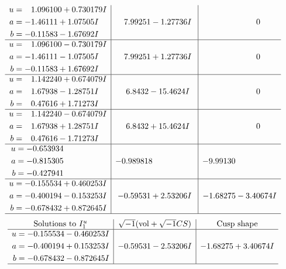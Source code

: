 \documentclass[1p]{elsarticle_modified}
\theoremstyle{definition}
\newcommand{\I}{\sqrt{-1}}
\begin{document}
$$\begin{array}{c|c|c}
\begin{aligned}
u &= \phantom{-}1.096100 + 0.730179 I \\
a &= -1.46111 + 1.07505 I \\
b &= -0.11583 - 1.67692 I\end{aligned}
 & \phantom{-}7.99251 - 1.27736 I & \phantom{-0.000000 } 0 \\ \hline\begin{aligned}
u &= \phantom{-}1.096100 - 0.730179 I \\
a &= -1.46111 - 1.07505 I \\
b &= -0.11583 + 1.67692 I\end{aligned}
 & \phantom{-}7.99251 + 1.27736 I & \phantom{-0.000000 } 0 \\ \hline\begin{aligned}
u &= \phantom{-}1.142240 + 0.674079 I \\
a &= \phantom{-}1.67938 - 1.28751 I \\
b &= \phantom{-}0.47616 + 1.71273 I\end{aligned}
 & \phantom{-}6.8432 - 15.4624 I & \phantom{-0.000000 } 0 \\ \hline\begin{aligned}
u &= \phantom{-}1.142240 - 0.674079 I \\
a &= \phantom{-}1.67938 + 1.28751 I \\
b &= \phantom{-}0.47616 - 1.71273 I\end{aligned}
 & \phantom{-}6.8432 + 15.4624 I & \phantom{-0.000000 } 0 \\ \hline\begin{aligned}
u &= -0.653934\phantom{ +0.000000I} \\
a &= -0.815305\phantom{ +0.000000I} \\
b &= -0.427941\phantom{ +0.000000I}\end{aligned}
 & -0.989818\phantom{ +0.000000I} & -9.99130\phantom{ +0.000000I} \\ \hline\begin{aligned}
u &= -0.155534 + 0.460253 I \\
a &= -0.400194 - 0.153253 I \\
b &= -0.678432 + 0.872645 I\end{aligned}
 & -0.59531 + 2.53206 I & -1.68275 - 3.40674 I\\
 \hline 
 \end{array}$$\newpage$$\begin{array}{c|c|c}  
\text{Solutions to }I^u_{1}& \I (\text{vol} + \sqrt{-1}CS) & \text{Cusp shape}\\
 \hline 
\begin{aligned}
u &= -0.155534 - 0.460253 I \\
a &= -0.400194 + 0.153253 I \\
b &= -0.678432 - 0.872645 I\end{aligned}
 & -0.59531 - 2.53206 I & -1.68275 + 3.40674 I\\
 \hline 
 \end{array}$$\newpage\newpage\renewcommand{\arraystretch}{1}
\end{document}
